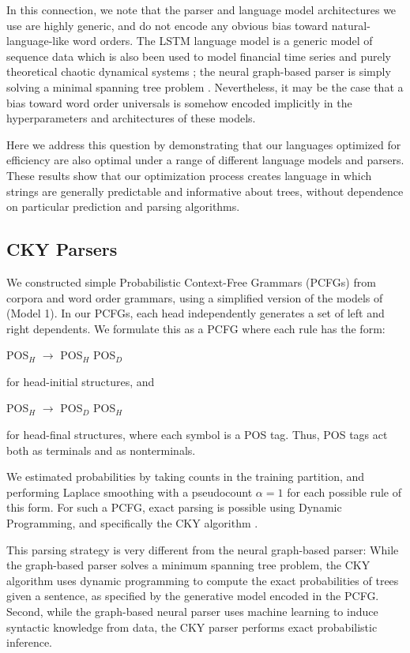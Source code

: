 \documentclass[10pt,twoside,lineno]{article}
\begin{document}
In this connection, we note that the parser and language model architectures we use are highly generic, and do not encode any obvious bias toward natural-language-like word orders. The LSTM language model is a generic model of sequence data which is also been used to model financial time series \citep{sirignano2018universal} and purely theoretical chaotic dynamical systems \citep{ogunmolu2016nonlinear}; the neural graph-based parser is simply solving a minimal spanning tree problem \citep{mcdonald2005nonprojective}. Nevertheless, it may be the case that a bias toward word order universals is somehow encoded implicitly in the hyperparameters and architectures of these models.

Here we address this question by demonstrating that our languages optimized for efficiency are also optimal under a range of different language models and parsers. These results show that our optimization process creates language in which strings are generally predictable and informative about trees, without dependence on particular prediction and parsing algorithms.


\subsection{CKY Parsers}


We constructed simple Probabilistic Context-Free Grammars (PCFGs) from corpora and word order grammars, using a simplified version of the models of \cite{collins2003head} (Model 1).
In our PCFGs, each head independently generates a set of left and right dependents.
We formulate this as a PCFG where each rule has the form:
\begin{center}
	POS$_H$ $\rightarrow$ POS$_H$ POS$_D$
\end{center}
for head-initial structures, and
\begin{center}
	POS$_H$ $\rightarrow$ POS$_D$ POS$_H$
\end{center}
for head-final structures, where each symbol is a POS tag.
Thus, POS tags act both as terminals and as nonterminals.

We estimated probabilities by taking counts in the training partition, and performing Laplace smoothing with a pseudocount $\alpha=1$ for each possible rule of this form.
For such a PCFG, exact parsing is possible using Dynamic Programming, and specifically the CKY algorithm \cite{kasami1966efficient}.

This parsing strategy is very different from the neural graph-based parser:
While the graph-based parser solves a minimum spanning tree problem, the CKY algorithm uses dynamic programming to compute the exact probabilities of trees given a sentence, as specified by the generative model encoded in the PCFG.
Second, while the graph-based neural parser uses machine learning to induce syntactic knowledge from data, the CKY parser performs exact probabilistic inference.
\end{document}
